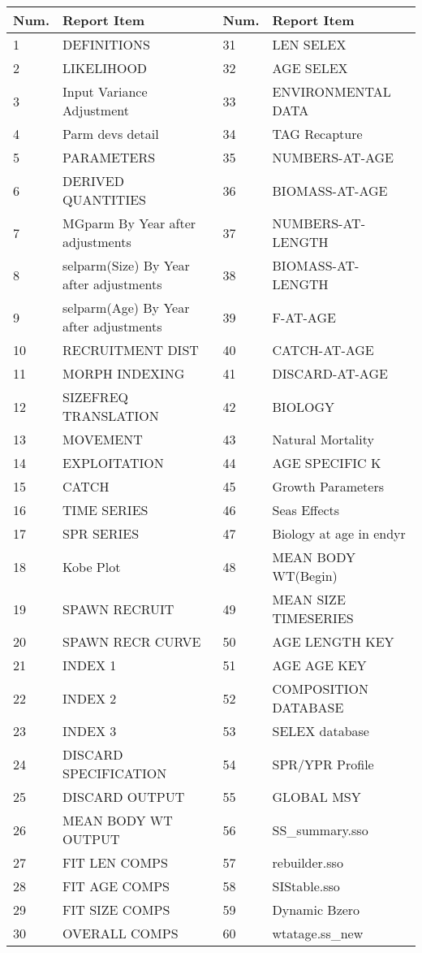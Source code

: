\begin{center}
	\begin{longtable}{p{1cm} p{6.5cm}p{1cm} p{6cm}}
		\hline
		Num. & Report Item & Num. & Report Item \Tstrut\Bstrut\\
		\hline
1	& DEFINITIONS				    &	31	&	LEN	SELEX \\			
2	& LIKELIHOOD					&	32	&	AGE	SELEX \\			
3	& Input Variance Adjustment	    &	33	&	ENVIRONMENTAL	DATA \\			
4	& Parm devs detail			    &	34	&	TAG	Recapture \\			
5	& PARAMETERS					&	35	&	NUMBERS-AT-AGE \\				
6	& DERIVED	QUANTITIES			&	36	&	BIOMASS-AT-AGE \\				
7	& MGparm By Year after adjustments &	37	& NUMBERS-AT-LENGTH	\\				
8	& selparm(Size) By Year after adjustments & 38 & BIOMASS-AT-LENGTH \\				
9	& selparm(Age) By Year after adjustments  &	39 & F-AT-AGE \\				
10	& RECRUITMENT	DIST			&	40	& CATCH-AT-AGE \\				
11	& MORPH	INDEXING				&	41	& DISCARD-AT-AGE \\				
12	& SIZEFREQ	TRANSLATION			&	42	&	BIOLOGY	\\				
13	& MOVEMENT					    &	43	&	Natural	Mortality \\			
14	& EXPLOITATION					&	44	&	AGE	SPECIFIC	K \\		
15	& CATCH					        &	45	&	Growth	Parameters \\			
16	& TIME	SERIES				    &	46	&	Seas	Effects	\\			
17	& SPR	SERIES				    &	47	&	Biology	at	age	in	endyr \\
18	& Kobe	Plot				    &	48	&	MEAN	BODY	WT(Begin) \\		
19	& SPAWN	RECRUIT				    &	49	&	MEAN	SIZE	TIMESERIES \\		
20	& SPAWN	RECR	CURVE			&	50	&	AGE	LENGTH	KEY	\\		
21	& INDEX	1				        &	51	&	AGE	AGE	KEY	\\		
22	& INDEX	2				        &	52	&	COMPOSITION	DATABASE \\			
23	& INDEX	3				        &	53	&	SELEX	database \\			
24	& DISCARD	SPECIFICATION		&	54	&	SPR/YPR	Profile	\\			
25	& DISCARD	OUTPUT				&	55	&	GLOBAL	MSY	\\			
26	& MEAN	BODY	WT	OUTPUT		&	56	&	SS\_summary.sso	\\				
27	& FIT	LEN	COMPS			    &	57	&	rebuilder.sso \\				
28	& FIT	AGE	COMPS			    &	58	&	SIStable.sso \\				
29	& FIT	SIZE	COMPS			&	59	&	Dynamic	Bzero \\			
30	& OVERALL	COMPS				&	60	&	wtatage.ss\_new	\\				
\hline
	\end{longtable}
\end{center}

